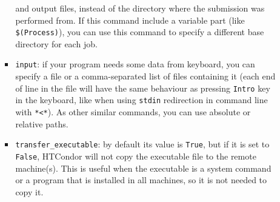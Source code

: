 \documentclass[a4paper,10pt]{article}
\begin{document}
\begin{itemize}
\begin{itemize}
\begin{itemize}
and output files, instead of the directory where the submission was
performed from. If this command include a variable part (like
\texttt{\$(Process)}), you can use this command to specify a different base
directory for each job.
\item \texttt{input}: if your program needs some data from keyboard, you can specify a
file or a comma-separated list of files containing it (each end of line in
the file will have the same behaviour as pressing \texttt{Intro} key in the
keyboard, like when using \texttt{stdin} redirection in command line with
\texttt{*<*}). As other similar commands, you can use absolute or relative paths.
\item \texttt{transfer\_executable}: by default its value is \texttt{True}, but if it is set to
\texttt{False}, HTCondor will not copy the executable file to the remote
machine(s). This is useful when the executable is a system command or a
program that is installed in all machines, so it is not needed to copy it.
\end{itemize}
\end{itemize}
\end{itemize}
\end{document}
